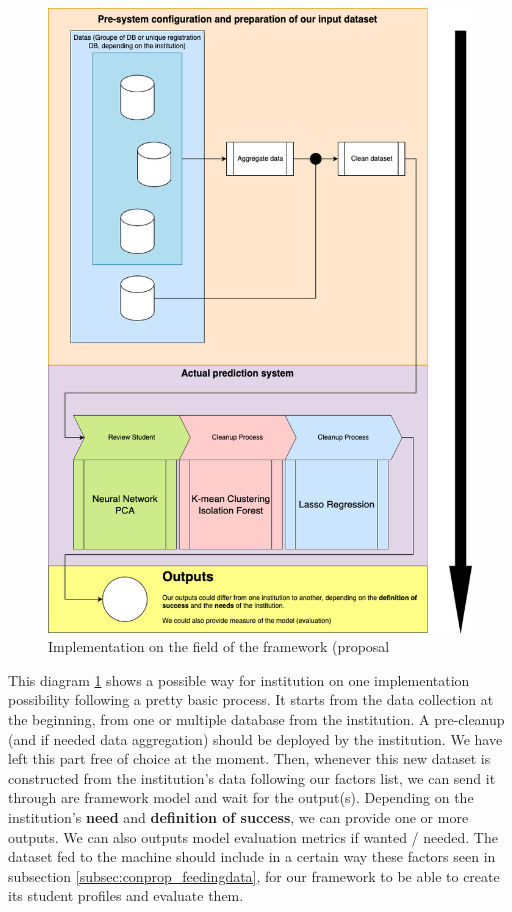 \documentclass[../main.tex]{subfiles}
\begin{document}
\begin{figure}[H]
    \centering
    \includegraphics[width=1\linewidth]{res//diagram/Fonc imp.png}
    \caption{Implementation on the field of the framework (proposal}
    \label{fig:imp_fonc}
\end{figure}

This diagram \ref{fig:imp_fonc} shows a possible way for institution on one implementation possibility following a pretty basic process. It starts from the data collection at the beginning, from one or multiple database from the institution. A pre-cleanup (and if needed data aggregation) should be deployed by the institution. We have left this part free of choice at  the moment.
Then, whenever this new dataset is constructed from the institution's data following our factors list, we can send it through are framework model and wait for the output(s). Depending on the institution's \textbf{need} and \textbf{definition of success}, we can provide one or more outputs. We can also outputs model evaluation metrics if wanted / needed. 
The dataset fed to the machine should include in a certain way these factors seen in subsection \ref{subsec:conprop_feedingdata}, for our framework to be able to create its student profiles and evaluate them.
\end{document}
